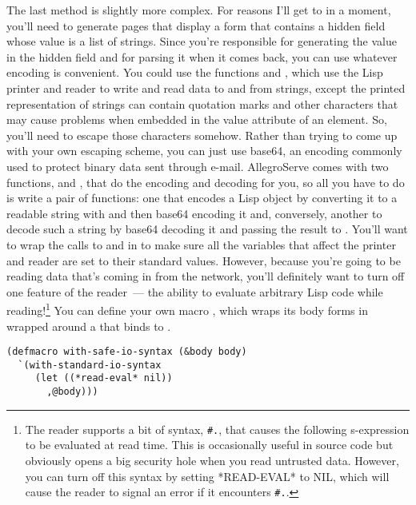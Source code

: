 The last  method is slightly more complex. For reasons I'll get to in a
moment, you'll need to generate pages that display a form that contains a hidden field
whose value is a list of strings. Since you're responsible for generating the value in the
hidden field and for parsing it when it comes back, you can use whatever encoding is
convenient. You could use the functions  and
, which use the Lisp printer and reader to write and read data to
and from strings, except the printed representation of strings can contain quotation marks
and other characters that may cause problems when embedded in the value attribute of an
 element. So, you'll need to escape those characters somehow. Rather than
trying to come up with your own escaping scheme, you can just use base64, an encoding
commonly used to protect binary data sent through e-mail. AllegroServe comes with two
functions,  and , that do the encoding and
decoding for you, so all you have to do is write a pair of functions: one that encodes a
Lisp object by converting it to a readable string with  and then
base64 encoding it and, conversely, another to decode such a string by base64 decoding it
and passing the result to . You'll want to wrap the calls to
 and  in  to
make sure all the variables that affect the printer and reader are set to their standard
values. However, because you're going to be reading data that's coming in from the
network, you'll definitely want to turn off one feature of the reader~--- the ability to
evaluate arbitrary Lisp code while reading!\footnote{The reader supports a bit of syntax,
  \lstinline!#.!, that causes the following s-expression to be evaluated at read
  time. This is occasionally useful in source code but obviously opens a big security hole
  when you read untrusted data. However, you can turn off this syntax by setting
  *READ-EVAL* to NIL, which will cause the reader to signal an error if it encounters
  \lstinline!#.!.} You can define your own macro , which wraps
its body forms in  wrapped around a  that binds
 to .

\begin{lstlisting}
(defmacro with-safe-io-syntax (&body body)
  `(with-standard-io-syntax
     (let ((*read-eval* nil))
       ,@body)))
\end{lstlisting}

